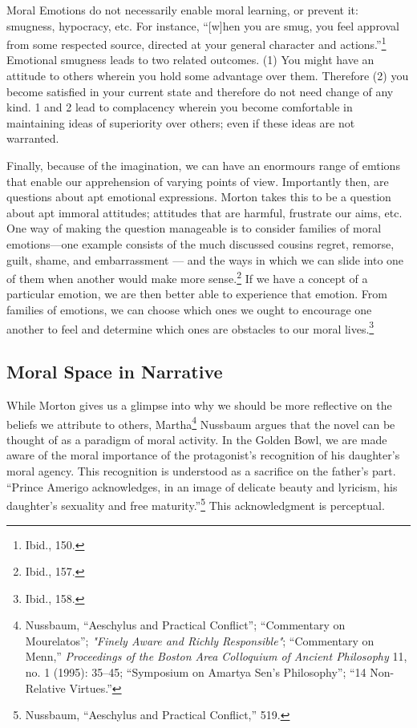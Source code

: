 \documentclass[phdthesis,12pt,final]{wuthesis}
\theoremstyle{definition}
\theoremstyle{definition}
\theoremstyle{definition}
\theoremstyle{definition}
\theoremstyle{remark}
\begin{document}
Moral Emotions do not necessarily enable moral learning, or prevent it: smugness, hypocracy, etc. For instance, ``{[}w{]}hen you are smug, you feel approval from some respected source, directed at your general character and actions.''\footnote{Ibid., 150.} Emotional smugness leads to two related outcomes. (1) You might have an attitude to others wherein you hold some advantage over them. Therefore (2) you become satisfied in your current state and therefore do not need change of any kind. 1 and 2 lead to complacency wherein you become comfortable in maintaining ideas of superiority over others; even if these ideas are not warranted.

Finally, because of the imagination, we can have an enormours range of emtions that enable our apprehension of varying points of view. Importantly then, are questions about apt emotional expressions. Morton takes this to be a question about apt immoral attitudes; attitudes that are harmful, frustrate our aims, etc. One way of making
the question manageable is to consider families of moral emotions---one example consists of the much discussed cousins regret, remorse, guilt, shame, and embarrassment --- and the ways in which we can slide into one of them when another would make more sense.\footnote{Ibid., 157.} If we have a concept of a particular emotion, we are then better able to experience that emotion. From families of emotions, we can choose which ones we ought to encourage one another to feel and determine which ones are obstacles to our moral lives.\footnote{Ibid., 158.}

\subsection*{Moral Space in Narrative}\label{moral-space-in-narrative}

While Morton gives us a glimpse into why we should be more reflective on the beliefs we attribute to others, Martha\footnote{Nussbaum, {``Aeschylus and Practical Conflict''}; {``Commentary on {Mourelatos}''}; \emph{"{Finely Aware} and {Richly Responsible}"}; {``Commentary on {Menn},''} \emph{Proceedings of the Boston Area Colloquium of Ancient Philosophy} 11, no. 1 (1995): 35--45; {``Symposium on {Amartya Sen}'s Philosophy''}; {``14 {Non-Relative Virtues}.''}} Nussbaum argues that the novel can be thought of as a paradigm of moral activity. In the Golden Bowl, we are made aware of the moral importance of the protagonist's recognition of his daughter's moral agency. This recognition is understood as a sacrifice on the father's part. ``Prince Amerigo acknowledges, in an image of delicate beauty and lyricism, his daughter's sexuality and free maturity.''\footnote{Nussbaum, {``Aeschylus and Practical Conflict,''} 519.} This acknowledgment is perceptual.
\end{document}
